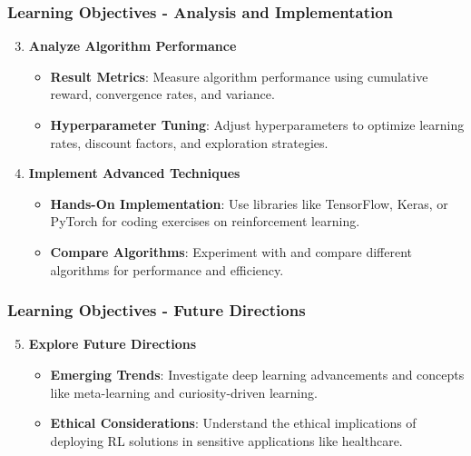 \documentclass[aspectratio=169]{beamer}
\begin{document}
\begin{frame}[fragile]
    \frametitle{Learning Objectives - Analysis and Implementation}
    \begin{enumerate}
        \setcounter{enumi}{2}
        \item \textbf{Analyze Algorithm Performance}
        \begin{itemize}
            \item \textbf{Result Metrics}: Measure algorithm performance using cumulative reward, convergence rates, and variance.
            \item \textbf{Hyperparameter Tuning}: Adjust hyperparameters to optimize learning rates, discount factors, and exploration strategies.
        \end{itemize}
        
        \item \textbf{Implement Advanced Techniques}
        \begin{itemize}
            \item \textbf{Hands-On Implementation}: Use libraries like TensorFlow, Keras, or PyTorch for coding exercises on reinforcement learning.
            \item \textbf{Compare Algorithms}: Experiment with and compare different algorithms for performance and efficiency.
        \end{itemize}
    \end{enumerate}
\end{frame}

\begin{frame}[fragile]
    \frametitle{Learning Objectives - Future Directions}
    \begin{enumerate}
        \setcounter{enumi}{4}
        \item \textbf{Explore Future Directions}
        \begin{itemize}
            \item \textbf{Emerging Trends}: Investigate deep learning advancements and concepts like meta-learning and curiosity-driven learning.
            \item \textbf{Ethical Considerations}: Understand the ethical implications of deploying RL solutions in sensitive applications like healthcare.
        \end{itemize}
    \end{enumerate}
\end{frame}
\end{document}
